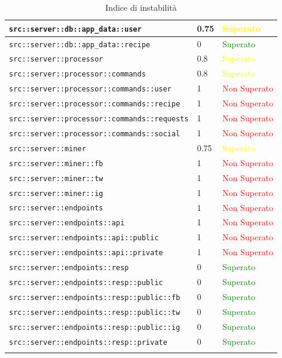 \begin{center}
\begin{longtable}{| p{8.5cm} | p{3.5cm} | p{3cm} |}
					\hline
					\texttt{src::server::db::app\_data::user} & 0.75 & \textcolor{yellow}{Superato}\\
					\hline
					\texttt{src::server::db::app\_data::recipe} & 0 & \textcolor{green}{Superato}\\
					\hline
					\texttt{src::server::processor} & 0.8 & \textcolor{yellow}{Superato}\\
					\hline
					\texttt{src::server::processor::commands} & 0.8 & \textcolor{yellow}{Superato}\\
					\hline
					\texttt{src::server::processor::commands::user} & 1 & \textcolor{red}{Non Superato}\\
					\hline
					\texttt{src::server::processor::commands::recipe} & 1 & \textcolor{red}{Non Superato}\\
					\hline
					\texttt{src::server::processor::commands::requests} & 1 & \textcolor{red}{Non Superato}\\
					\hline
					\texttt{src::server::processor::commands::social} & 1 & \textcolor{red}{Non Superato}\\
					\hline
					\texttt{src::server::miner} & 0.75 & \textcolor{yellow}{Superato}\\
					\hline
					\texttt{src::server::miner::fb} & 1 & \textcolor{red}{Non Superato}\\
					\hline
					\texttt{src::server::miner::tw} & 1 & \textcolor{red}{Non Superato}\\
					\hline
					\texttt{src::server::miner::ig} & 1 & \textcolor{red}{Non Superato}\\
					\hline
					\texttt{src::server::endpoints} & 1 & \textcolor{red}{Non Superato}\\
					\hline
					\texttt{src::server::endpoints::api} & 1 & \textcolor{red}{Non Superato}\\
					\hline
					\texttt{src::server::endpoints::api::public} & 1 & \textcolor{red}{Non Superato}\\
					\hline
					\texttt{src::server::endpoints::api::private} & 1 & \textcolor{red}{Non Superato}\\
					\hline
					\texttt{src::server::endpoints::resp} & 0 & \textcolor{green}{Superato}\\
					\hline
					\texttt{src::server::endpoints::resp::public} & 0 & \textcolor{green}{Superato}\\
					\hline
					\texttt{src::server::endpoints::resp::public::fb} & 0 & \textcolor{green}{Superato}\\
					\hline
					\texttt{src::server::endpoints::resp::public::tw} & 0 & \textcolor{green}{Superato}\\
					\hline
					\texttt{src::server::endpoints::resp::public::ig} & 0 & \textcolor{green}{Superato}\\
					\hline
					\texttt{src::server::endpoints::resp::private} & 0 & \textcolor{green}{Superato}\\
					\hline
					\caption{Indice di instabilità}
				\end{longtable}
				\egroup
			\end{center}		
			
